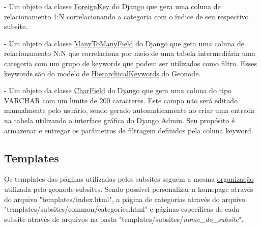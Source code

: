 \documentclass[12pt]{article}
\begin{document}
\begin{description}
  \setlength\itemsep{1em}

  \item[fk]
  - Um objeto da classe
  \textcolor{blue}
    {\href{https://docs.djangoproject.com/en/5.0/ref/models/fields/#django.db.models.ForeignKey}
    {ForeignKey}}
  do Django que gera uma coluna de relacionamento 1:N correlacionando a categoria com o índice de seu respectivo subsite. 

  \item[keyword]
  - Um objeto da classe
    \textcolor{blue}
    {\href{https://docs.djangoproject.com/en/5.0/ref/models/fields/#django.db.models.ManyToManyField}
    {ManyToManyField}} 
  do Django que gera uma coluna de relacionamento N:N que
  correlaciona por meio de uma tabela intermediária uma categoria com um
  grupo de keywords que podem ser utilizados como filtro. Esses keywords são do modelo de 
    \textcolor{blue}
    {\href{https://docs.geonode.org/en/master/admin/admin_panel/index.html#hierarchical-keywords}
    {HierarchicalKeywords}}
  do Geonode.

  \item[keywords\_filter\_url]
  - Um objeto da classe 
    \textcolor{blue}
    {\href{https://docs.djangoproject.com/en/5.0/ref/models/fields/#django.db.models.CharField}
    {CharField}} 
  do Django que gera uma coluna do tipo VARCHAR com um limite de
  200 caracteres. Este campo não será editado manualmente pelo usuário, sendo
  gerado automaticamente ao criar uma entrada na tabela utilizando a
  interface gráfica do Django Admin. Seu propósito é armazenar e entregar os
  parâmetros de filtragem definidos pela coluna keyword.
\end{description}

\subsection{Templates}

Os templates das páginas utilizadas pelos subsites seguem a mesma 
  \textcolor{blue}
  {\href{https://github.com/geosolutions-it/geonode-subsites/tree/main?tab=readme-ov-file#folder-structure}
  {organização}} 
utilizada pelo geonode-subsites. Sendo possível personalizar a
homepage através do arquivo "templates/index.html", a página de categorias
através do arquivo "templates/subsites/common/categories.html" e páginas
específicas de cada subsite através de arquivos na pasta
"templates/subsites/\textit{nome\_do\_subsite}".
\end{document}
